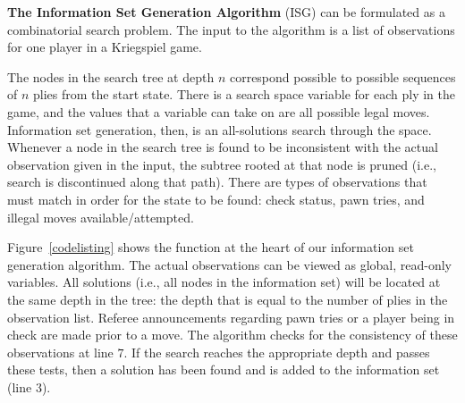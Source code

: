 \documentclass[times, 10pt,twocolumn]{article}
\begin{document}

   
\textbf{The Information Set Generation Algorithm}
(ISG) can be formulated as a combinatorial search problem.  The input to the algorithm is a list
of observations for one player in a Kriegspiel game.    

The nodes in the search tree at depth $n$ correspond possible to possible sequences of $n$ plies from the start state.
There is a search space variable for each ply in the game, and the values that a variable can take on are all possible
legal moves.  Information set generation, then, is an all-solutions search through the space.  Whenever a node in the search tree is
found to be inconsistent with the actual observation given in the input, the
subtree rooted at that node is pruned (i.e., search is discontinued along that
path).  There are types of observations that must match in order for the state
to be found: check status, pawn tries, and illegal moves available/attempted.

Figure~\ref{codelisting} shows the function at the heart of our information set generation algorithm.  The actual
observations can be viewed as global, read-only variables.  All solutions (i.e., all nodes in the information set) will
be located at the same depth in the tree: the depth that is equal to the number of plies in the observation list.
Referee announcements regarding pawn tries or a player being in check are made prior to a move.  The algorithm checks
for the consistency of these observations at line $7$.  If the search reaches the appropriate depth and passes these
tests, then a solution has been found and is added to the information set (line $3$).  
\end{document}
